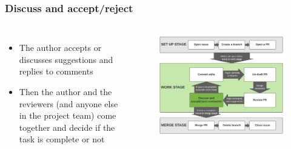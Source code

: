 \documentclass[aspectratio=169]{beamer} %
\begin{document}
\begin{frame}
	\frametitle{Discuss and accept/reject}
	\begin{columns}[c]

		\begin{itemize}
			\setlength\itemsep{1em}
			\item The author accepts or discusses suggestions and replies to comments
			\item Then the author and the reviewers (and anyone else in the project team) come together and decide if the task is complete or not
		\end{itemize}

		\vspace{-.75cm}
		\begin{figure}
			\centering
			\includegraphics[width=\textwidth]{./img/branch-pr-merge-cycle-S2-4.png}
		\end{figure}

	\end{columns}
\end{frame}
\end{document}
